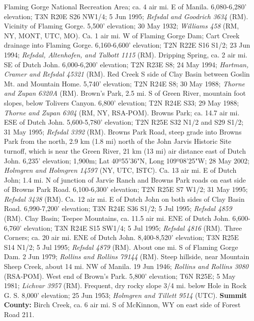 Flaming Gorge National Recreation Area; ca. 4 air mi. E of Manila.
6,080-6,280' elevation; T3N R20E S26 NW1/4; 5 Jun 1995;
\textit{Refsdal and Goodrich 3634} (RM).
Vicinity of Flaming Gorge. 5,500' elevation; 30 May 1932;
\textit{Williams 458} (RM, NY, MONT, UTC, MO).
Ca. 1 air mi. W of Flaming Gorge Dam; Cart Creek drainage into Flaming Gorge.
6,160-6,600' elevation; T2N R22E S16 S1/2; 23 Jun 1994;
\textit{Refsdal, Altenhofen, and Talbott 1115} (RM).
Dripping Spring, ca. 2 air mi. SE of Dutch John. 6,000-6,200' elevation;
T2N R23E S8; 24 May 1994; \textit{Hartman, Cramer and Refsdal 45321} (RM).
Red Creek S side of Clay Basin between Goslin Mt. and Mountain Home. 5,740'
elevation; T2N R24E S8; 30 May 1988; \textit{Thorne and Zupan 6320A} (RM).
Brown's Park, 2.5 mi. S of Green River, mountain foot slopes, below Tolivers
Canyon. 6,800' elevation; T2N R24E S33; 29 May 1988;
\textit{Thorne and Zupan 6304} (RM, NY, RSA-POM).
Browns Park; ca. 14.7 air mi. ESE of Dutch John. 5,600-5,780' elevation;
T2N R25E S32 N1/2 and S29 S1/2; 31 May 1995; \textit{Refsdal 3392} (RM).
Browns Park Road, steep grade into Browns Park from the north, 2.9 km (1.8 mi)
north of the John Jarvis Historic Site turnoff, which is near the Green River,
21 km (13 mi) air distance east of Dutch John. 6,235' elevation; 1,900m;
Lat 40º55'36"N, Long 109º08'25"W; 28 May 2002;
\textit{Holmgren and Holmgren 14597} (NY, UTC, ISTC).
Ca. 13 air mi. E of Dutch John; 1.4 mi. N of junction of Jarvie Ranch and Browns
Park roads on east side of Browns Park Road. 6,100-6,300' elevation;
T2N R25E S7 W1/2; 31 May 1995; \textit{Refsdal 3438} (RM).
Ca. 12 air mi. E of Dutch John on both sides of Clay Basin Road. 6,990-7,200'
elevation; T3N R24E S36 S1/2; 5 Jul 1995; \textit{Refsdal 4859} (RM).
Clay Basin; Teepee Mountains, ca. 11.5 air mi. ENE of Dutch John. 6,600-6,760'
elevation; T3N R24E S15 SW1/4; 5 Jul 1995; \textit{Refsdal 4816} (RM).
Three Corners; ca. 20 air mi. ENE of Dutch John. 8,400-8,520' elevation;
T3N R25E S14 N1/2; 5 Jul 1995; \textit{Refsdal 4879} (RM).
About one mi. S of Flaming Gorge Dam. 2 Jun 1979;
\textit{Rollins and Rollins 79144} (RM).
Steep hillside, near Mountain Sheep Creek, about 14 mi. NW of Manila.
19 Jun 1946; \textit{Rollins and Rollins 3080} (RSA-POM).
West end of Brown's Park. 5,800' elevation; T6N R25E; 5 May 1981;
\textit{Lichvar 3957} (RM).
Frequent, dry rocky slope 3/4 mi. below Hole in Rock G. S. 8,000' elevation;
25 Jun 1953; \textit{Holmgren and Tillett 9514} (UTC).
  \textbf{Summit County:}
Birch Creek, ca. 6 air mi. S of McKinnon, WY on east side of Forest Road 211.
